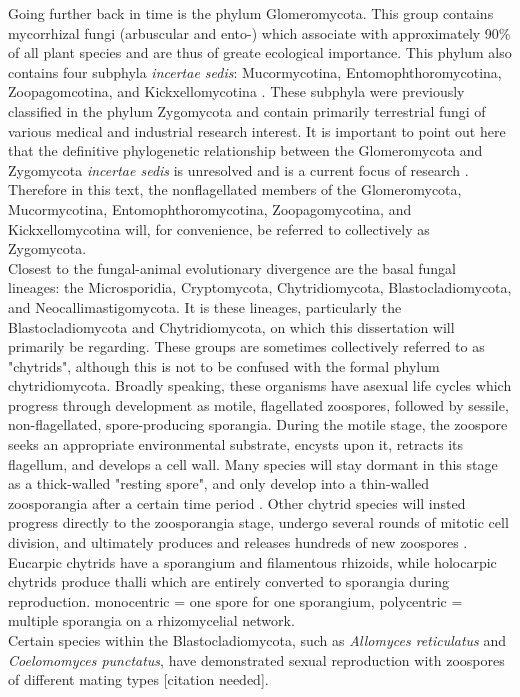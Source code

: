 \indent Going further back in time is the phylum Glomeromycota. This group contains mycorrhizal fungi (arbuscular and ento-) which associate with approximately 90\% of all plant species and are thus of greate ecological importance. This phylum also contains four subphyla \textit{incertae sedis}: Mucormycotina, Entomophthoromycotina, Zoopagomcotina, and Kickxellomycotina \cite{White2006}. These subphyla were previously classified in the phylum Zygomycota and contain primarily terrestrial fungi of various medical and industrial research interest. It is important to point out here that the definitive phylogenetic relationship between the Glomeromycota and Zygomycota \textit{incertae sedis} is unresolved and is a current focus of research \cite{Hibbett2007}. Therefore in this text, the nonflagellated members of the Glomeromycota, Mucormycotina, Entomophthoromycotina, Zoopagomycotina, and Kickxellomycotina will, for convenience, be referred to collectively as Zygomycota.\\ 
\indent Closest to the fungal-animal evolutionary divergence are the basal fungal lineages: the Microsporidia, Cryptomycota, Chytridiomycota, Blastocladiomycota, and Neocallimastigomycota. It is these lineages, particularly the Blastocladiomycota and Chytridiomycota, on which this dissertation will primarily be regarding. These groups are sometimes collectively referred to as "chytrids", although this is not to be confused with the formal phylum chytridiomycota. Broadly speaking, these organisms have asexual life cycles which progress through development as motile, flagellated zoospores, followed by sessile, non-flagellated, spore-producing sporangia. During the motile stage, the zoospore seeks an appropriate environmental substrate, encysts upon it, retracts its flagellum, and develops a cell wall. Many species will stay dormant in this stage as a thick-walled "resting spore", and only develop into a thin-walled zoosporangia after a certain time period \cite{James2006}. Other chytrid species will insted progress directly to the zoosporangia stage, undergo several rounds of mitotic cell division, and ultimately produces and releases hundreds of new zoospores \cite{}. \\
\indent Eucarpic chytrids have a sporangium and filamentous rhizoids, while holocarpic chytrids produce thalli which are entirely converted to sporangia during reproduction. monocentric = one spore for one sporangium, polycentric = multiple sporangia on a rhizomycelial network. \\
\indent Certain species within the Blastocladiomycota, such as \textit{Allomyces reticulatus} and \textit{Coelomomyces punctatus},  have demonstrated sexual reproduction with zoospores of different mating types [citation needed].\\
